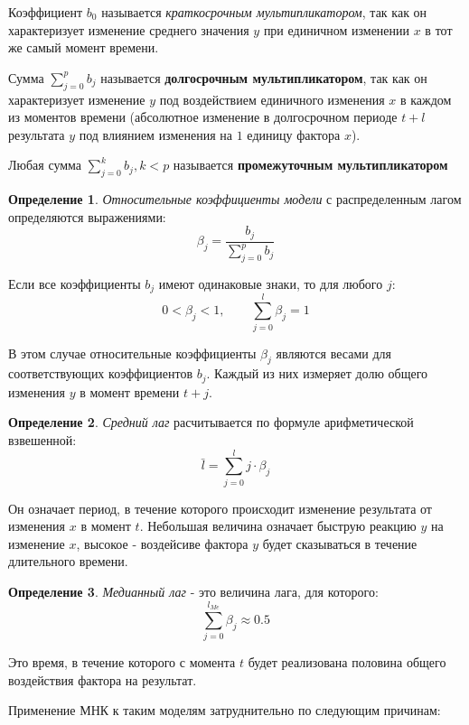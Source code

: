 \documentclass[aps,%
12pt,%
final,%
oneside,
onecolumn,%
musixtex, %
superscriptaddress,%
centertags]{article} %
\theoremstyle{plain}
\theoremstyle{definition}
\newtheorem{definition}{Определение}[subsection]
\theoremstyle{remark}
\begin{document}
Коэффициент $b_0$ называется \textit{краткосрочным мультипликатором}, так как он характеризует изменение среднего значения $y$ при единичном изменении $x$ в тот же самый момент времени.

Сумма $\sum\limits_{j=0}^p b_j$ называется \textbf{долгосрочным мультипликатором}, так как он характеризует изменение $y$ под воздействием единичного изменения $x$ в каждом из моментов времени (абсолютное изменение в долгосрочном периоде $t+l$ результата $y$ под влиянием изменения на $1$ единицу фактора $x$).

Любая сумма $\sum\limits_{j=0}^k b_j, k <p$ называется \textbf{промежуточным мультипликатором}

\begin{definition}
	\textit{Относительные коэффициенты модели} с распределенным лагом определяются выражениями:
	$$\beta_j = \frac{b_j}{\sum\limits_{j=0}^p b_j}$$
\end{definition}

Если все коэффициенты $b_j$ имеют одинаковые знаки, то для любого $j$:
$$0 < \beta_j < 1, \qquad \sum\limits_{j=0}^l \beta_j = 1$$

В этом случае относительные коэффициенты $\beta_j$ являются весами для соответствующих коэффициентов $b_j$. Каждый из них измеряет долю общего изменения $y$ в момент времени $t+j$.

\begin{definition}
	\textit{Средний лаг} расчитывается по формуле арифметической взвешенной:
	$$\bar{l} = \sum\limits_{j=0}^l j \cdot \beta_j$$

	Он означает период, в течение которого происходит изменение результата от изменения $x$ в момент $t$. Небольшая величина означает быструю реакцию $y$ на изменение $x$, высокое - воздейсиве фактора $y$ будет сказываться в течение длительного времени.
\end{definition} 

\begin{definition}
	\textit{Медианный лаг} - это величина лага, для которого:
	$$\sum\limits_{j=0}^{l_{Me}} \beta_j \approx 0.5$$

	Это время, в течение которого с момента $t$ будет реализована половина общего воздействия фактора на результат.
\end{definition}

Применение МНК к таким моделям затруднительно по следующим причинам:
\end{document}
